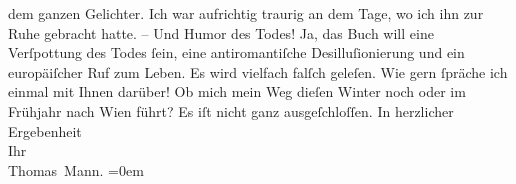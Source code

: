 \begin{ledgroupsized}[t]{13cm}
                    dem ganzen Gelichter. Ich war aufrichtig traurig an dem Tage, wo ich ihn zur
                    Ruhe gebracht hatte. – Und Humor des Todes! Ja, das Buch will eine Verſpot{\pb}tung des Todes ſein, eine
                    antiromantiſche Desilluſionierung und ein europäiſcher Ruf zum Leben. Es wird vielfach falſch geleſen.\pend
           \pstart
           Wie gern ſpräche ich einmal mit Ihnen darüber! Ob mich mein Weg dieſen Winter
                    noch oder im Frühjahr nach Wien führt? Es iſt
                    nicht ganz ausgeſchloſſen.\pend
           \pstart
           In herzlicher Ergebenheit{\\[\baselineskip]}Ihr{\\[\baselineskip]}\spacefill\mbox{Thomas Mann.}\pend
           \leftskip=0em{}\endnumbering{}\end{ledgroupsized}  \newcommand{\dateiname}{L02430}\newcommand{\titel}{Thomas Mann an Arthur Schnitzler, 9. 1. 1925}\newcommand{\editorInnen}{Martin Anton Müller und Gerd-Hermann Susen}
      